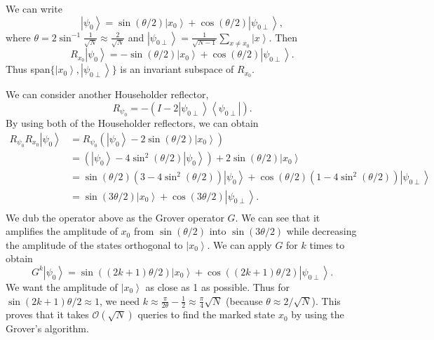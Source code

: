\documentclass[11pt]{article}
\newcommand{\bra}[1]{\left\langle #1\right|}
\newcommand{\ket}[1]{\left|#1\right\rangle}
\begin{document}
We can write 
\begin{equation}
    \ket{\psi_0} = \sin(\theta/2)\ket{x_0} + \cos(\theta/2)\ket{\psi_{0\perp}},
\end{equation}
where $\theta = 2\sin^{-1}\frac{1}{\sqrt{N}} \approx \frac{2}{\sqrt{N}}$ and $\ket{\psi_{0\perp}} = \frac{1}{\sqrt{N-1}}\sum_{x\neq x_0}\ket{x}$. Then 
\begin{equation}
    R_{x_0}\ket{\psi_0} = -\sin(\theta/2)\ket{x_0} + \cos(\theta/2)\ket{\psi_{0\perp}}.
\end{equation}
Thus span$\{\ket{x_0},\ket{\psi_{0\perp}}\}$ is an invariant subspace of $R_{x_0}$. 

We can consider another Householder reflector, 
\begin{equation}
    R_{\psi_{0}} = -(I - 2\ket{\psi_{0\perp}}\bra{\psi_{0\perp}}).
\end{equation}
By using both of the Householder reflectors, we can obtain 
\begin{align}
    R_{\psi_{0}}R_{x_0}\ket{\psi_0} &= R_{\psi_0}(\ket{\psi_0} - 2\sin(\theta/2)\ket{x_0}) \nonumber \\
    &= (\ket{\psi_0} - 4\sin^2(\theta/2)\ket{\psi_0}) + 2\sin(\theta/2)\ket{x_0} \nonumber \\ 
    &= \sin(\theta/2)(3 - 4\sin^2(\theta/2))\ket{\psi_0} + \cos(\theta/2)(1 - 4\sin^2(\theta/2))\ket{\psi_{0\perp}}\nonumber \\ 
    &= \sin(3\theta/2)\ket{x_0} + \cos(3\theta/2)\ket{\psi_{0\perp}}.\nonumber \\ 
\end{align}
We dub the operator above as the Grover operator $G$. We can see that it amplifies the amplitude of $x_0$ from $\sin(\theta/2)$ into $\sin(3\theta/2)$ while decreasing the amplitude of the states orthogonal to $\ket{x_0}$. We can apply $G$ for $k$ times to obtain 
\begin{equation}
    G^k\ket{\psi_0} = \sin((2k+1)\theta/2)\ket{x_0} + \cos((2k+1)\theta/2)\ket{\psi_{0\perp}}.
\end{equation}
We want the amplitude of $\ket{x_0}$ as close as 1 as possible. Thus for $\sin(2k+1)\theta/2 \approx 1$, we need $k \approx \frac{\pi}{2\theta} - \frac{1}{2}\approx \frac{\pi}{4}\sqrt{N}$ (because $\theta \approx 2/\sqrt{N}$). This proves that it takes $\mathcal{O}(\sqrt{N})$ queries to find the marked state $x_0$ by using the Grover's algorithm.




\end{document}
